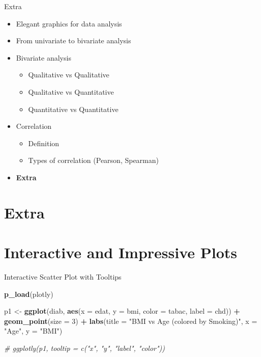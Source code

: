 \documentclass[
  ignorenonframetext,
]{beamer}
\newenvironment{Shaded}{\begin{snugshade}}{\end{snugshade}}
\newcommand{\AttributeTok}[1]{\textcolor[rgb]{0.13,0.29,0.53}{#1}}
\newcommand{\CommentTok}[1]{\textcolor[rgb]{0.56,0.35,0.01}{\textit{#1}}}
\newcommand{\DecValTok}[1]{\textcolor[rgb]{0.00,0.00,0.81}{#1}}
\newcommand{\FunctionTok}[1]{\textcolor[rgb]{0.13,0.29,0.53}{\textbf{#1}}}
\newcommand{\NormalTok}[1]{#1}
\newcommand{\OtherTok}[1]{\textcolor[rgb]{0.56,0.35,0.01}{#1}}
\newcommand{\SpecialCharTok}[1]{\textcolor[rgb]{0.81,0.36,0.00}{\textbf{#1}}}
\newcommand{\StringTok}[1]{\textcolor[rgb]{0.31,0.60,0.02}{#1}}
\begin{document}
\begin{frame}{Extra}
\begin{itemize}
\item
  Elegant graphics for data analysis
\item
  From univariate to bivariate analysis
\item
  Bivariate analysis

  \begin{itemize}
  \item
    Qualitative vs Qualitative
  \item
    Qualitative vs Quantitative
  \item
    Quantitative vs Quantitative
  \end{itemize}
\item
  Correlation

  \begin{itemize}
  \item
    Definition
  \item
    Types of correlation (Pearson, Spearman)
  \end{itemize}
\item
  \textbf{Extra}
\end{itemize}
\end{frame}

\section{Extra}\label{extra-1}

\section{Interactive and Impressive
Plots}\label{interactive-and-impressive-plots}

\begin{frame}[fragile]{Interactive Scatter Plot with Tooltips}
\label{interactive-scatter-plot-with-tooltips}
\begin{Shaded}
\begin{Highlighting}[]
\FunctionTok{p\_load}\NormalTok{(plotly)}

\NormalTok{p1 }\OtherTok{\textless{}{-}} \FunctionTok{ggplot}\NormalTok{(diab, }\FunctionTok{aes}\NormalTok{(}\AttributeTok{x =}\NormalTok{ edat, }\AttributeTok{y =}\NormalTok{ bmi, }\AttributeTok{color =}\NormalTok{ tabac, }\AttributeTok{label =}\NormalTok{ chd)) }\SpecialCharTok{+}
  \FunctionTok{geom\_point}\NormalTok{(}\AttributeTok{size =} \DecValTok{3}\NormalTok{) }\SpecialCharTok{+}
  \FunctionTok{labs}\NormalTok{(}\AttributeTok{title =} \StringTok{"BMI vs Age (colored by Smoking)"}\NormalTok{, }\AttributeTok{x =} \StringTok{"Age"}\NormalTok{, }\AttributeTok{y =} \StringTok{"BMI"}\NormalTok{)}

\CommentTok{\# ggplotly(p1, tooltip = c("x", "y", "label", "color"))}
\end{Highlighting}
\end{Shaded}
\end{frame}
\end{document}
